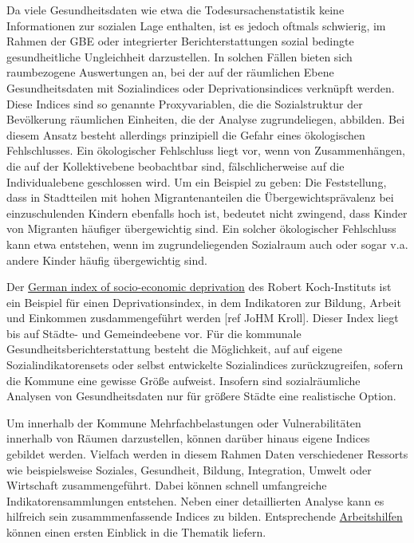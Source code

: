\documentclass{article}
\begin{document}
Da viele Gesundheitsdaten wie etwa die Todesursachenstatistik keine Informationen zur sozialen Lage enthalten, ist es jedoch oftmals schwierig, im Rahmen der GBE oder integrierter Berichterstattungen sozial bedingte gesundheitliche Ungleichheit darzustellen. In solchen Fällen bieten sich raumbezogene Auswertungen an, bei der auf der räumlichen Ebene Gesundheitsdaten mit Sozialindices oder Deprivationsindices verknüpft werden. Diese Indices sind so genannte Proxyvariablen, die die Sozialstruktur der Bevölkerung räumlichen Einheiten, die der Analyse zugrundeliegen, abbilden. Bei diesem Ansatz besteht allerdings prinzipiell die Gefahr eines ökologischen Fehlschlusses. Ein ökologischer Fehlschluss liegt vor, wenn von Zusammenhängen, die auf der Kollektivebene beobachtbar sind, fälschlicherweise auf die Individualebene geschlossen wird. Um ein Beispiel zu geben: Die Feststellung, dass in Stadtteilen mit hohen Migrantenanteilen die Übergewichtsprävalenz bei einzuschulenden Kindern ebenfalls hoch ist, bedeutet nicht zwingend, dass Kinder von Migranten häufiger übergewichtig sind. Ein solcher ökologischer Fehlschluss kann etwa entstehen, wenn im zugrundeliegenden Sozialraum auch oder sogar v.a. andere Kinder häufig übergewichtig sind.   


Der \href{https://lekroll.github.io/GISD/}{German index of socio-economic deprivation} des Robert Koch-Instituts ist ein Beispiel für einen Deprivationsindex, in dem Indikatoren zur Bildung, Arbeit und Einkommen zusdammengeführt werden [ref JoHM Kroll]. Dieser Index liegt bis auf Städte- und Gemeindeebene vor. Für die kommunale Gesundheitsberichterstattung besteht die Möglichkeit, auf auf eigene Sozialindikatorensets oder selbst entwickelte Sozialindices zurückzugreifen, sofern die Kommune eine gewisse Größe aufweist. Insofern sind sozialräumliche Analysen von Gesundheitsdaten nur für größere Städte eine realistische Option. 


Um innerhalb der Kommune Mehrfachbelastungen oder Vulnerabilitäten innerhalb von Räumen darzustellen, können darüber hinaus eigene Indices gebildet werden. Vielfach werden in diesem Rahmen Daten verschiedener Ressorts wie beispielsweise Soziales, Gesundheit, Bildung, Integration, Umwelt oder Wirtschaft zusammengeführt. Dabei können schnell umfangreiche Indikatorensammlungen entstehen. Neben einer detaillierten Analyse kann es hilfreich sein zusammmenfassende Indices zu bilden. Entsprechende \href{https://www.gib.nrw.de/service/downloaddatenbank/lebenslagen-in-sozialraeumen-auf-einen-blick-indizes-in-der-kommunalen-berichterstattung}{Arbeitshilfen} können einen ersten Einblick in die Thematik liefern.
\end{document}
